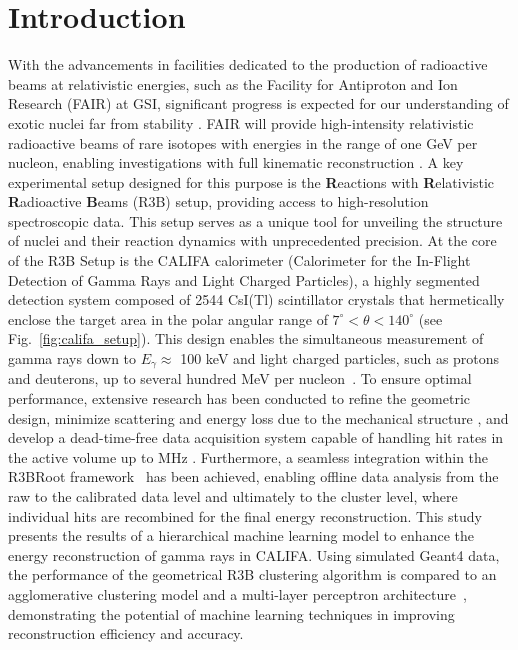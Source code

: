 \documentclass[review,sort&compress]{elsarticle}
\begin{document}
\section{Introduction}
\label{sec:intro}
With the advancements in facilities dedicated to the production of radioactive beams at relativistic energies, such as the Facility for Antiproton and Ion Research (FAIR) at GSI, significant progress is expected for our understanding of exotic nuclei far from stability \cite{kalantar2024experiments}. FAIR will provide high-intensity relativistic radioactive beams of rare isotopes with energies in the range of one GeV per nucleon, enabling investigations with full kinematic reconstruction \cite{leifels2025status}.
A key experimental setup designed for this purpose is the \textbf{R}eactions with \textbf{R}elativistic \textbf{R}adioactive \textbf{B}eams (R3B) setup, providing access to high-resolution spectroscopic data. This setup serves as a unique tool for unveiling the structure of nuclei and their reaction dynamics with unprecedented precision.\newline
At the core of the R3B Setup is the CALIFA calorimeter (Calorimeter for the In-Flight Detection of Gamma Rays and Light Charged Particles), a highly segmented detection system composed of 2544 CsI(Tl) scintillator crystals that hermetically enclose the target area in the polar angular range of $7^\circ < \theta < 140^\circ$ (see Fig.~\ref{fig:califa_setup}). This design enables the simultaneous measurement of gamma rays down to $E_{\gamma} \approx$ 100 keV and light charged particles, such as protons and deuterons, up to several hundred MeV per nucleon~\cite{cortina2014califa}. To ensure optimal performance, extensive research has been conducted to refine the geometric design, minimize scattering and energy loss due to the mechanical structure \cite{alvarez2014performance}, and develop a dead-time-free data acquisition system capable of handling hit rates in the active volume up to MHz \cite{ledigital}. Furthermore, a seamless integration within the R3BRoot framework~\cite{bertini2011r3broot} has been achieved, enabling offline data analysis from the raw to the calibrated data level and ultimately to the cluster level, where individual hits are recombined for the final energy reconstruction.\newline
This study presents the results of a hierarchical machine learning model to enhance the energy reconstruction of gamma rays in CALIFA. Using simulated Geant4 data, the performance of the geometrical R3B clustering algorithm is compared to an agglomerative clustering model \cite{Nielsen2016} and a multi-layer perceptron architecture~\cite{popescu2009multilayer}, demonstrating the potential of machine learning techniques in improving reconstruction efficiency and accuracy.\newline
\end{document}
